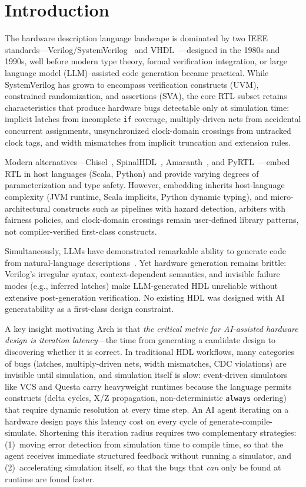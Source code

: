 \documentclass[11pt,twocolumn]{article}
\begin{document}
\section{Introduction}\label{sec:intro}

The hardware description language landscape is dominated by two IEEE standards---Verilog/SystemVerilog~\cite{ieee1800} and VHDL~\cite{ieee1076}---designed in the 1980s and 1990s, well before modern type theory, formal verification integration, or large language model (LLM)--assisted code generation became practical.
While SystemVerilog has grown to encompass verification constructs (UVM), constrained randomization, and assertions (SVA), the core RTL subset retains characteristics that produce hardware bugs detectable only at simulation time:
implicit latches from incomplete \texttt{if} coverage, multiply-driven nets from accidental concurrent assignments, unsynchronized clock-domain crossings from untracked clock tags, and width mismatches from implicit truncation and extension rules.

Modern alternatives---Chisel~\cite{chisel}, SpinalHDL~\cite{spinalhdl}, Amaranth~\cite{amaranth}, and PyRTL~\cite{pyrtl}---embed RTL in host languages (Scala, Python) and provide varying degrees of parameterization and type safety.
However, embedding inherits host-language complexity (JVM runtime, Scala implicits, Python dynamic typing), and micro-architectural constructs such as pipelines with hazard detection, arbiters with fairness policies, and clock-domain crossings remain user-defined library patterns, not compiler-verified first-class constructs.

Simultaneously, LLMs have demonstrated remarkable ability to generate code from natural-language descriptions~\cite{codex,copilot}.
Yet hardware generation remains brittle: Verilog's irregular syntax, context-dependent semantics, and invisible failure modes (e.g., inferred latches) make LLM-generated HDL unreliable without extensive post-generation verification.
No existing HDL was designed with AI generatability as a first-class design constraint.

A key insight motivating Arch is that \emph{the critical metric for AI-assisted hardware design is iteration latency}---the time from generating a candidate design to discovering whether it is correct. In traditional HDL workflows, many categories of bugs (latches, multiply-driven nets, width mismatches, CDC violations) are invisible until simulation, and simulation itself is slow: event-driven simulators like VCS and Questa carry heavyweight runtimes because the language permits constructs (delta cycles, X/Z propagation, non-deterministic \texttt{always} ordering) that require dynamic resolution at every time step. An AI agent iterating on a hardware design pays this latency cost on every cycle of generate-compile-simulate. Shortening this iteration radius requires two complementary strategies: (1)~moving error detection from simulation time to compile time, so that the agent receives immediate structured feedback without running a simulator, and (2)~accelerating simulation itself, so that the bugs that \emph{can} only be found at runtime are found faster.
\end{document}
